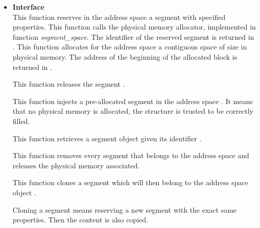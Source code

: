 \begin{itemize}
  \item {\bf Interface}\\
             {
               This function reserves in the address space
              a segment with specified properties. This
             function calls the physical memory allocator, implemented
             in function \emph{segment\_space}. The identifier
             of the reserved segment is returned in .
	     }
     {
       This function allocates for the address space  a
       contiguous space of size  in physical
       memory. The address of the beginning of the allocated block is
       returned in .
     }

             {
               This function releases the segment .
             }

	     {
	       This function injects a pre-allocated segment in the
	       address space . It means that no physical
	       memory is allocated, the  structure is
	       trusted to be correctly filled.
	     }

       {
	 This function retrieves a segment object  given its identifier
	 .
       }

              {
		This function removes every segment that belongs to
		the address space  and releases the
		physical memory associated.
              }

             {
               This function clones a segment which will then belong to
               the address space object .

               Cloning a segment means reserving a new segment with the
               exact same properties. Then the content is also copied.
             }


\end{itemize}

